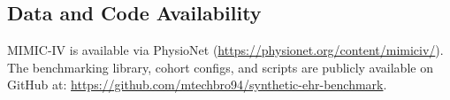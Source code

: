 \documentclass[journal]{IEEEtran}
\begin{document}
\subsection*{Data and Code Availability}
MIMIC-IV is available via PhysioNet (\url{https://physionet.org/content/mimiciv/}). The benchmarking library, cohort configs, and scripts are publicly available on GitHub at: \url{https://github.com/mtechbro94/synthetic-ehr-benchmark}.



\end{document}
